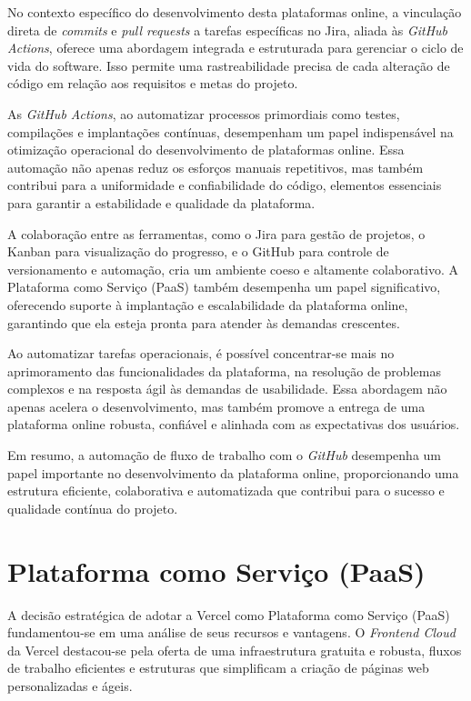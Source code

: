 No contexto específico do desenvolvimento desta plataformas online, a vinculação direta de \textit{commits} e \textit{pull requests} a tarefas específicas no Jira, aliada às \textit{GitHub Actions}, oferece uma abordagem integrada e estruturada para gerenciar o ciclo de vida do software. Isso permite uma rastreabilidade precisa de cada alteração de código em relação aos requisitos e metas do projeto.

As \textit{GitHub Actions}, ao automatizar processos primordiais como testes, compilações e implantações contínuas, desempenham um papel indispensável na otimização operacional do desenvolvimento de plataformas online. Essa automação não apenas reduz os esforços manuais repetitivos, mas também contribui para a uniformidade e confiabilidade do código, elementos essenciais para garantir a estabilidade e qualidade da plataforma.

A colaboração entre as ferramentas, como o Jira para gestão de projetos, o Kanban para visualização do progresso, e o GitHub para controle de versionamento e automação, cria um ambiente coeso e altamente colaborativo. A Plataforma como Serviço (PaaS) também desempenha um papel significativo, oferecendo suporte à implantação e escalabilidade da plataforma online, garantindo que ela esteja pronta para atender às demandas crescentes.

Ao automatizar tarefas operacionais, é possível concentrar-se mais no aprimoramento das funcionalidades da plataforma, na resolução de problemas complexos e na resposta ágil às demandas de usabilidade. Essa abordagem não apenas acelera o desenvolvimento, mas também promove a entrega de uma plataforma online robusta, confiável e alinhada com as expectativas dos usuários.

Em resumo, a automação de fluxo de trabalho com o \textit{GitHub} desempenha um papel importante no desenvolvimento da plataforma online, proporcionando uma estrutura eficiente, colaborativa e automatizada que contribui para o sucesso e qualidade contínua do projeto.

\section{Plataforma como Serviço (PaaS)}
A decisão estratégica de adotar a Vercel como Plataforma como Serviço (PaaS) fundamentou-se em uma análise de seus recursos e vantagens. O \textit{Frontend Cloud} da Vercel destacou-se pela oferta de uma infraestrutura gratuita e robusta, fluxos de trabalho eficientes e estruturas que simplificam a criação de páginas web personalizadas e ágeis.

